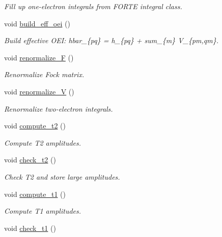 \begin{DoxyCompactItemize}
\begin{DoxyCompactList}\small\item\em Fill up one-\/electron integrals from F\+O\+R\+TE integral class. \end{DoxyCompactList}\item 
void \mbox{\hyperlink{classforte_1_1_d_s_r_g___m_r_p_t2_ac7c512a7d07ebfb7281ecc254637d513}{build\+\_\+eff\+\_\+oei}} ()
\begin{DoxyCompactList}\small\item\em Build effective O\+EI\+: hbar\+\_\+\{pq\} = h\+\_\+\{pq\} + sum\+\_\+\{m\} V\+\_\+\{pm,qm\}. \end{DoxyCompactList}\item 
void \mbox{\hyperlink{classforte_1_1_d_s_r_g___m_r_p_t2_ae7d4e5e977b7a7a199d0fa6dc68cbb6b}{renormalize\+\_\+F}} ()
\begin{DoxyCompactList}\small\item\em Renormalize Fock matrix. \end{DoxyCompactList}\item 
void \mbox{\hyperlink{classforte_1_1_d_s_r_g___m_r_p_t2_a05348e6a6dcad58a2d7e5e529ca86c41}{renormalize\+\_\+V}} ()
\begin{DoxyCompactList}\small\item\em Renormalize two-\/electron integrals. \end{DoxyCompactList}\item 
void \mbox{\hyperlink{classforte_1_1_d_s_r_g___m_r_p_t2_a0064cc44b232168515fdbea517136720}{compute\+\_\+t2}} ()
\begin{DoxyCompactList}\small\item\em Compute T2 amplitudes. \end{DoxyCompactList}\item 
void \mbox{\hyperlink{classforte_1_1_d_s_r_g___m_r_p_t2_a7d705e4e6386fd92f6212aa642c69a42}{check\+\_\+t2}} ()
\begin{DoxyCompactList}\small\item\em Check T2 and store large amplitudes. \end{DoxyCompactList}\item 
void \mbox{\hyperlink{classforte_1_1_d_s_r_g___m_r_p_t2_ad87625724c9dc201aacd227d5238911d}{compute\+\_\+t1}} ()
\begin{DoxyCompactList}\small\item\em Compute T1 amplitudes. \end{DoxyCompactList}\item 
void \mbox{\hyperlink{classforte_1_1_d_s_r_g___m_r_p_t2_a70e1a5eefd827e9d46f99e3734868afe}{check\+\_\+t1}} ()

\end{DoxyCompactItemize}
